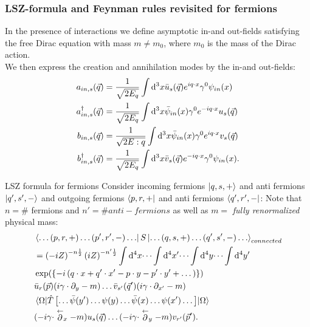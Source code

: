\subsubsection{LSZ-formula and Feynman rules revisited for fermions}
In the presence of interactions we define asymptotic in-and out-fields satisfying the free Dirac equation with mass $m\neq m_0$, where $m_0$ is the mass of the Dirac action.\\
We then express the creation and annihilation modes by the in-and out-fields:
\begin{align}
	a_{in,s}(\vec{q}) &= \frac{1}{\sqrt{2 E_q} } \int \mathrm{d}^3 x \bar{u}_s(\vec{q}) e^{i q\cdot  x} \gamma^0 \psi_{in}(x) \\
	a^{\dagger}_{in,s}(\vec{q}) &= \frac{1}{\sqrt{2 E_q}} \int \mathrm{d}^3 x \bar{\psi}_{in} (x) \gamma^0 e^{ -i q \cdot x} u_s(\vec{q}) \\
	b_{in,s}(\vec{q}) &= \frac{1}{\sqrt{2 E:q}} \int \mathrm{d}^3 x \bar{\psi}_{in}(x) \gamma^0 e^{i q\cdot x} v_s(\vec{q}) \\
	b^{\dagger}_{in,s}(\vec{q}) &= \frac{1}{\sqrt{2 E_q}} \int \mathrm{d}^3 x \bar{v}_s(\vec{q}) e^{-i q\cdot x} \gamma^0 \psi_{in}(x).
\end{align}
\begin{mybox}{LSZ formula for fermions}
Consider incoming fermions $\ket{q,s,+}$ and anti fermions $\ket{q',s',-}$ and outgoing fermions $\bra{p,r,+}$ and anti fermions $\bra{q',r',-}$: Note that $n=\#$ fermions and $n'=\# anti-fermions$ as well as $m=$ \emph{fully renormalized} physical mass:
\begin{align}
	&\bra{\dots (p,r,+) \dots (p',r',-) \dots} S \ket{\dots (q,s,+) \dots (q',s',-) \dots }_{connected}\nonumber  \\
	&= \left(-i Z\right)^{- n \frac{1}{2} } \left(i Z\right)^{- n' \frac{1}{2}}  \int \mathrm{d}^4 x \dots \int \mathrm{d}^4 x'\dots \int \mathrm{d}^4 y \dots \int \mathrm{d}^4 y'  \nonumber\\
	&\exp(\left\{ -i \left(q\cdot x+q'\cdot x'-p \cdot y - p'\cdot y' + \dots \right)     \right\}) \nonumber \\
	&\bar{u}_r(\vec{p})  (i \gamma \cdot \partial_y -m) \dots \bar{v}_{s'} (\vec{q}')(i \gamma \cdot \partial_{x'} -m) \nonumber \\
	& \expval{\hat{T}\left[\dots \bar{\psi}(y') \dots \psi(y) \dots \bar{\psi}(x) \dots \psi(x') \dots \right]}{\Omega}\nonumber \\
	& (-i \gamma \cdot \stackrel{\leftarrow}{\partial}_x -m) u_s(\vec{q}) \dots (-i \gamma \cdot \stackrel{\leftarrow}{\partial}_y -m) v_{r'}(\vec{p} ').
\end{align}
\end{mybox}
